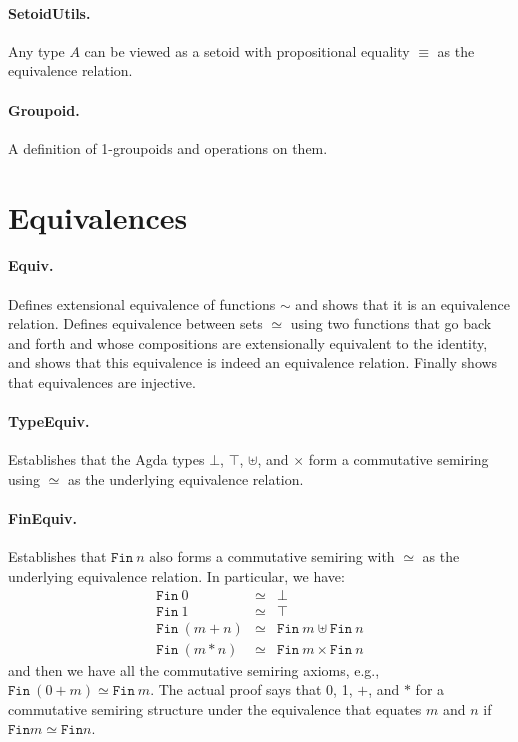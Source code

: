 \documentclass{article}
\begin{document}
\paragraph*{SetoidUtils.} Any type $A$ can be viewed as a setoid with propositional equality $\equiv$ as the equivalence relation.

\paragraph*{Groupoid.} A definition of 1-groupoids and operations on them.

\section{Equivalences} 

\paragraph*{Equiv.} Defines extensional equivalence of functions $\sim$ and shows that it is an equivalence relation. Defines equivalence between sets $\simeq$ using two functions that go back and forth and whose compositions are extensionally equivalent to the identity, and shows that this equivalence is indeed an equivalence relation. Finally shows that equivalences are injective.

\paragraph*{TypeEquiv.} Establishes that the Agda types $\bot$, $\top$, $\uplus$, and $\times$ form a commutative semiring using $\simeq$ as the underlying equivalence relation.

\paragraph*{FinEquiv.} Establishes that $\texttt{Fin}~n$ also forms a commutative semiring with $\simeq$ as the underlying equivalence relation. In particular, we have:
\[\begin{array}{rcll}
\texttt{Fin}~0 &\simeq& \bot \\
\texttt{Fin}~1 &\simeq& \top \\
\texttt{Fin}~(m+n) &\simeq& \texttt{Fin}~m \uplus \texttt{Fin}~n \\
\texttt{Fin}~(m*n) &\simeq& \texttt{Fin}~m \times \texttt{Fin}~n
\end{array}\]
and then we have all the commutative semiring axioms, e.g.,
$\texttt{Fin}~(0+m) \simeq \texttt{Fin}~m$. The actual proof says that
0, 1, $+$, and $*$ for a commutative semiring structure under the
equivalence that equates $m$ and $n$ if $\texttt{Fin} m \simeq \texttt{Fin} n$.
\end{document}
